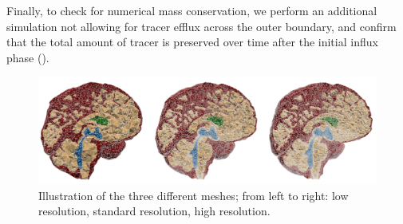 \documentclass[fleqn,10pt]{wlscirep}
\begin{document}
Finally, to check for numerical mass conservation, we perform an
additional simulation not allowing for tracer efflux across the outer
boundary, and confirm that the total amount of tracer is preserved
over time after the initial influx phase
().
\begin{figure}
    \centering
\includegraphics[width=0.9\linewidth]{figures/mesh_refinement.png}
    \caption{Illustration of the three different meshes; from left to right: low resolution, standard resolution, high resolution.}
    \label{fig:mesh_refinement}
\end{figure}
\end{document}
